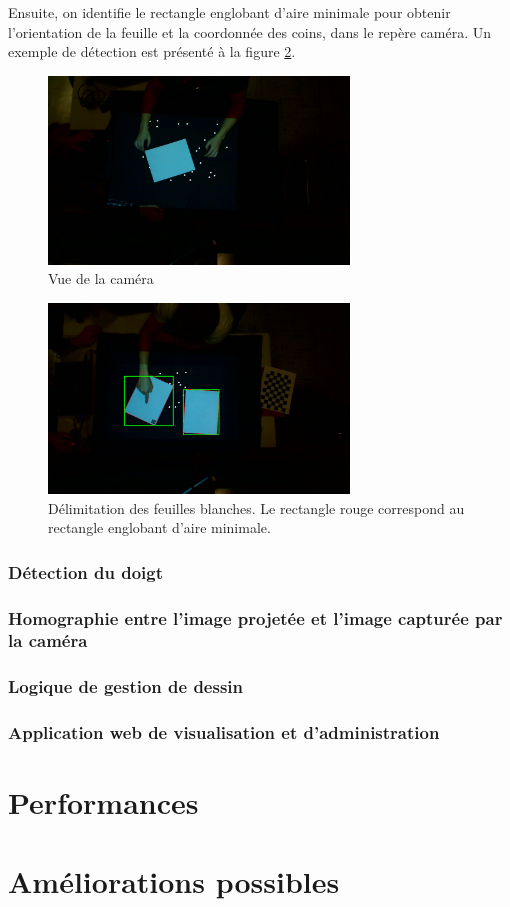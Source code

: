 \documentclass[11pt]{report}
\begin{document}
Ensuite, on identifie le rectangle englobant d'aire minimale pour obtenir
l'orientation de la feuille et la coordonnée des coins, dans le repère caméra.
Un exemple de détection est présenté à la figure \ref{detection_feuille}.

\begin{figure}[h]
  \centering
  \includegraphics[width=8cm]{feuille-blanche.jpg}
  \caption{Vue de la caméra}
  \label{feuille_blanche}
\end{figure}

\begin{figure}[h]
  \centering
  \includegraphics[width=8cm]{localisation-feuille.png}
  \caption{Délimitation des feuilles blanches.
    Le rectangle rouge correspond au rectangle englobant d'aire minimale.}
  \label{detection_feuille}
\end{figure}

\subsubsection{Détection du doigt}

\subsubsection{Homographie entre l'image projetée et l'image capturée par la caméra}

\subsubsection{Logique de gestion de dessin}

\subsubsection{Application web de visualisation et d'administration}


\section{Performances}

\section{Améliorations possibles}
\end{document}
